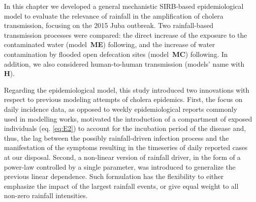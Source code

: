 In this chapter we developed a general mechanistic SIRB-based epidemiological model to evaluate the relevance of rainfall in the amplification of cholera transmission, focusing on the 2015 Juba outbreak. Two rainfall-based transmission processes were compared: the direct increase of the exposure to the contaminated water (model~\textbf{ME}) following\cite{Eisenberg:ExaminingRainfallCholera:2013}, and the increase of water contamination by flooded open defecation sites (model~\textbf{MC}) following\cite{Rinaldo:Reassessment20102011:2012}. In addition, we also considered human-to-human transmission (models' name with \textbf{H}).

Regarding the epidemiological model, this study introduced two innovations with respect to previous modeling attempts of cholera epidemics\cite{Bertuzzo:ProbabilityExtinctionHaiti:2016,Pasetto:RealtimeProjectionsCholera:2017}. First, the focus on daily incidence data, as opposed to weekly epidemiological reports commonly used in modelling works, motivated the introduction of a compartment of exposed individuals (eq. \ref{eq:E2}) to account for the incubation period of the disease and, thus, the lag between the possibly rainfall-driven infection process and the manifestation of the symptoms resulting in the timeseries of daily reported cases at our disposal. %
Second, a non-linear version of rainfall driver, in the form of a power-law controlled by a single parameter, was introduced to generalize the previous linear dependence. Such formulation has the flexibility to either emphasize the impact of the largest rainfall events, or give equal weight to all non-zero rainfall intensities. %

